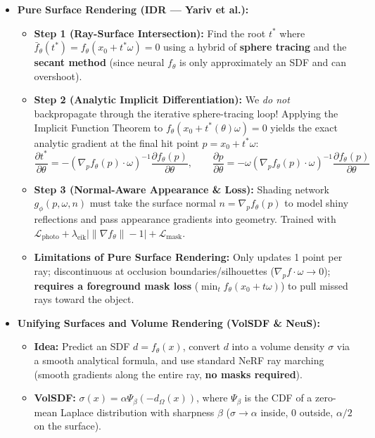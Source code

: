 \documentclass[11pt,a4paper]{article}
\theoremstyle{definition}
\theoremstyle{plain}
\theoremstyle{remark}
\begin{document}
\begin{itemize}
    \item \textbf{Pure Surface Rendering (IDR --- Yariv et al.):}
    \begin{itemize}
        \item \textbf{Step 1 (Ray-Surface Intersection):} Find the root $t^*$ where $\bar{f}_\theta(t^*) = f_\theta(x_0 + t^*\omega) = 0$ using a hybrid of \textbf{sphere tracing} and the \textbf{secant method} (since neural $f_\theta$ is only approximately an SDF and can overshoot).
        \item \textbf{Step 2 (Analytic Implicit Differentiation):} We \emph{do not} backpropagate through the iterative sphere-tracing loop! Applying the Implicit Function Theorem to $f_\theta(x_0 + t^*(\theta)\omega) = 0$ yields the exact analytic gradient at the final hit point $p = x_0 + t^*\omega$:
        $$\frac{\partial t^*}{\partial \theta} = -\left(\nabla_p f_\theta(p) \cdot \omega\right)^{-1} \frac{\partial f_\theta(p)}{\partial \theta}, \qquad \frac{\partial p}{\partial \theta} = -\omega\left(\nabla_p f_\theta(p) \cdot \omega\right)^{-1} \frac{\partial f_\theta(p)}{\partial \theta}$$
        \item \textbf{Step 3 (Normal-Aware Appearance \& Loss):} Shading network $g_\phi(p, \omega, n)$ must take the surface normal $n = \nabla_p f_\theta(p)$ to model shiny reflections and pass appearance gradients into geometry. Trained with $\mathcal{L}_{\text{photo}} + \lambda_{\text{eik}}\big|\|\nabla f_\theta\| - 1\big| + \mathcal{L}_{\text{mask}}$.
        \item \textbf{Limitations of Pure Surface Rendering:} Only updates 1 point per ray; discontinuous at occlusion boundaries/silhouettes ($\nabla_p f \cdot \omega \to 0$); \textbf{requires a foreground mask loss} ($\min_t f_\theta(x_0+t\omega)$) to pull missed rays toward the object.
    \end{itemize}
    \item \textbf{Unifying Surfaces and Volume Rendering (VolSDF \& NeuS):}
    \begin{itemize}
        \item \textbf{Idea:} Predict an SDF $d = f_\theta(x)$, convert $d$ into a volume density $\sigma$ via a smooth analytical formula, and use standard NeRF ray marching (smooth gradients along the entire ray, \textbf{no masks required}).
        \item \textbf{VolSDF:} $\sigma(x) = \alpha \Psi_\beta(-d_\Omega(x))$, where $\Psi_\beta$ is the CDF of a zero-mean Laplace distribution with sharpness $\beta$ ($\sigma \to \alpha$ inside, $0$ outside, $\alpha/2$ on the surface).

\end{itemize}
\end{itemize}
\end{document}
